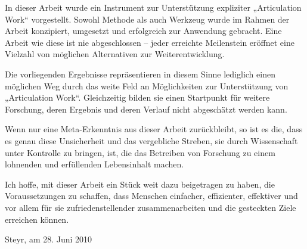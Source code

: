 In dieser Arbeit wurde ein Instrument zur Unterstützung expliziter „Articulation Work“ vorgestellt. Sowohl Methode als auch Werkzeug wurde im Rahmen der Arbeit konzipiert, umgesetzt und erfolgreich zur Anwendung gebracht. Eine Arbeit wie diese ist nie abgeschlossen -- jeder erreichte Meilenstein eröffnet eine Vielzahl von möglichen Alternativen zur Weiterentwicklung. 

Die vorliegenden Ergebnisse repräsentieren in diesem Sinne lediglich einen möglichen Weg durch das weite Feld an Möglichkeiten zur Unterstützung von „Articulation Work“. Gleichzeitig bilden sie einen Startpunkt für weitere Forschung, deren Ergebnis und deren Verlauf nicht abgeschätzt werden kann. 

Wenn nur eine Meta-Erkenntnis aus dieser Arbeit zurückbleibt, so ist es die, dass es genau diese Unsicherheit und das vergebliche Streben, sie durch Wissenschaft unter Kontrolle zu bringen, ist, die das Betreiben von Forschung zu einem lohnenden und erfüllenden Lebensinhalt machen. 

Ich hoffe, mit dieser Arbeit ein Stück weit dazu beigetragen zu haben, die Voraussetzungen zu schaffen, dass Menschen einfacher, effizienter, effektiver und vor allem für sie zufriedenstellender zusammenarbeiten und die gesteckten Ziele erreichen können.

\begin{flushright}
 Steyr, am 28. Juni 2010
\end{flushright}

